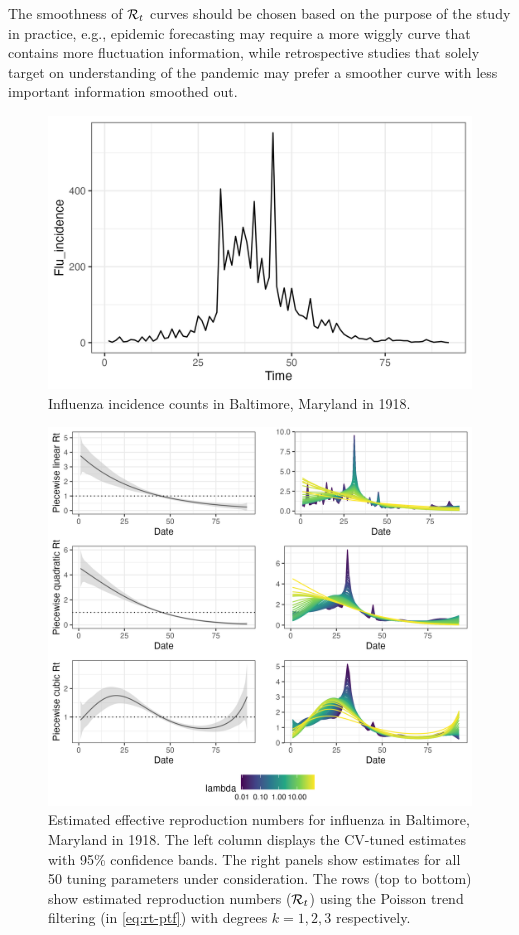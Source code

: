  The
smoothness of $\mathcal{R}_t$ curves should be chosen based on the purpose of the
study in practice, e.g., epidemic forecasting may require a more wiggly curve
that contains more fluctuation information, while retrospective studies that
solely target on understanding of the pandemic may prefer a smoother curve with
less important information smoothed out. 

\begin{figure}[tb]
    \centering
    \includegraphics[width=0.9\linewidth]{fig/flu_dat.png}
    \caption{Influenza incidence counts in Baltimore, Maryland in
    1918. } 
    \label{fig:flu-dat}
\end{figure} 

\begin{figure}[tb]
    \centering
    \includegraphics[width=0.9\linewidth]{fig/flu_full_res.png}
    \caption{Estimated effective reproduction numbers for influenza in
    Baltimore, Maryland in 1918. The left column displays the CV-tuned estimates
    with 95\% confidence bands. The right panels show estimates for all
    50 tuning parameters under consideration. The rows (top to bottom) show
    estimated reproduction numbers ($\mathcal{R}_t$) using the Poisson trend filtering
    (in \eqref{eq:rt-ptf}) with degrees $k=1,2,3$ respectively.} 
    \label{fig:flu-res}
\end{figure} 

